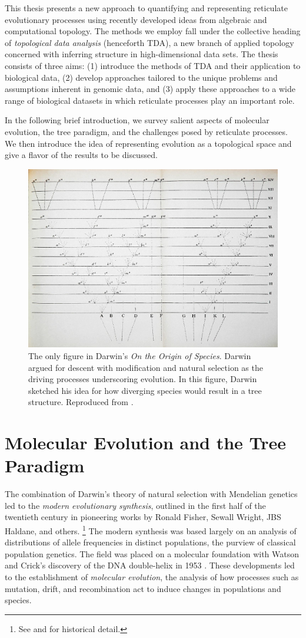 This thesis presents a new approach to quantifying and representing reticulate evolutionary processes using recently developed ideas from algebraic and computational topology.
The methods we employ fall under the collective heading of \emph{topological data analysis} (henceforth TDA), a new branch of applied topology concerned with inferring structure in high-dimensional data sets.
The thesis consists of three aims: (1) introduce the methods of TDA and their application to biological data, (2) develop approaches tailored to the unique problems and assumptions inherent in genomic data, and (3) apply these approaches to a wide range of biological datasets in which reticulate processes play an important role.

In the following brief introduction, we survey salient aspects of molecular evolution, the tree paradigm, and the challenges posed by reticulate processes.
We then introduce the idea of representing evolution as a topological space and give a flavor of the results to be discussed.

\begin{figure}
\centering
\includegraphics[width=.5\columnwidth]{./fig/introduction/Darwin_divergence.jpg}
\caption[Charles Darwin's Evolutionary Tree]{The only figure in Darwin's \emph{On the Origin of Species}. Darwin argued for descent with modification and natural selection as the driving processes underscoring evolution. In this figure, Darwin sketched his idea for how diverging species would result in a tree structure. Reproduced from \cite{Darwin:1859uh}.}
\label{fig:darwin_origin}
\end{figure}

\section{Molecular Evolution and the Tree Paradigm}

The combination of Darwin's theory of natural selection with Mendelian genetics led to the \emph{modern evolutionary synthesis}, outlined in the first half of the twentieth century in pioneering works by Ronald Fisher, Sewall Wright, JBS Haldane, and others.
\footnote{See \cite{Huxley:1942} and \cite{Gould:2002ts} for historical detail.}
The modern synthesis was based largely on an analysis of distributions of allele frequencies in distinct populations, the purview of classical population genetics.
The field was placed on a molecular foundation with Watson and Crick's discovery of the DNA double-helix in 1953 \cite{Watson:1953wm}.
These developments led to the establishment of \emph{molecular evolution}, the analysis of how processes such as mutation, drift, and recombination act to induce changes in populations and species.


